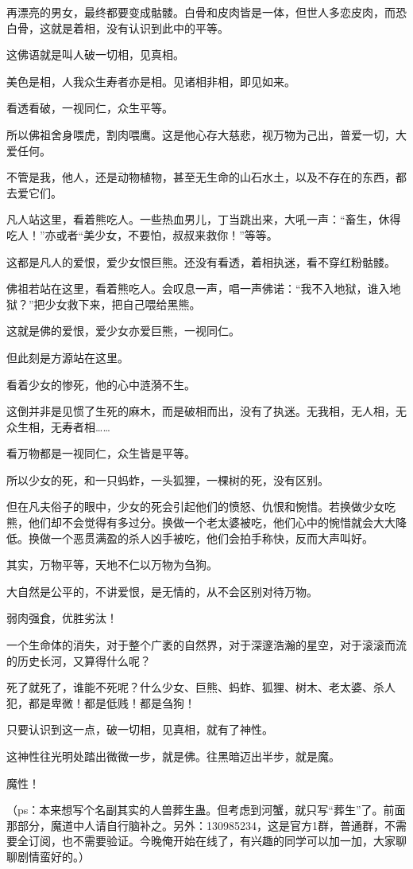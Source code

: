 \begin{this_body}
再漂亮的男女，最终都要变成骷髅。白骨和皮肉皆是一体，但世人多恋皮肉，而恐白骨，这就是着相，没有认识到此中的平等。

这佛语就是叫人破一切相，见真相。

美色是相，人我众生寿者亦是相。见诸相非相，即见如来。

看透看破，一视同仁，众生平等。

所以佛祖舍身喂虎，割肉喂鹰。这是他心存大慈悲，视万物为己出，普爱一切，大爱任何。

不管是我，他人，还是动物植物，甚至无生命的山石水土，以及不存在的东西，都去爱它们。

凡人站这里，看着熊吃人。一些热血男儿，丁当跳出来，大吼一声：“畜生，休得吃人！”亦或者“美少女，不要怕，叔叔来救你！”等等。

这都是凡人的爱恨，爱少女恨巨熊。还没有看透，着相执迷，看不穿红粉骷髅。

佛祖若站在这里，看着熊吃人。会叹息一声，唱一声佛诺：“我不入地狱，谁入地狱？”把少女救下来，把自己喂给黑熊。

这就是佛的爱恨，爱少女亦爱巨熊，一视同仁。

但此刻是方源站在这里。

看着少女的惨死，他的心中涟漪不生。

这倒并非是见惯了生死的麻木，而是破相而出，没有了执迷。无我相，无人相，无众生相，无寿者相……

看万物都是一视同仁，众生皆是平等。

所以少女的死，和一只蚂蚱，一头狐狸，一棵树的死，没有区别。

但在凡夫俗子的眼中，少女的死会引起他们的愤怒、仇恨和惋惜。若换做少女吃熊，他们却不会觉得有多过分。换做一个老太婆被吃，他们心中的惋惜就会大大降低。换做一个恶贯满盈的杀人凶手被吃，他们会拍手称快，反而大声叫好。

其实，万物平等，天地不仁以万物为刍狗。

大自然是公平的，不讲爱恨，是无情的，从不会区别对待万物。

弱肉强食，优胜劣汰！

一个生命体的消失，对于整个广袤的自然界，对于深邃浩瀚的星空，对于滚滚而流的历史长河，又算得什么呢？

死了就死了，谁能不死呢？什么少女、巨熊、蚂蚱、狐狸、树木、老太婆、杀人犯，都是卑微！都是低贱！都是刍狗！

只要认识到这一点，破一切相，见真相，就有了神性。

这神性往光明处踏出微微一步，就是佛。往黑暗迈出半步，就是魔。

魔性！

（ps：本来想写个名副其实的人兽葬生蛊。但考虑到河蟹，就只写“葬生”了。前面那部分，魔道中人请自行脑补之。另外：130985234，这是官方1群，普通群，不需要全订阅，也不需要验证。今晚俺开始在线了，有兴趣的同学可以加一加，大家聊聊剧情蛮好的。）

\end{this_body}

